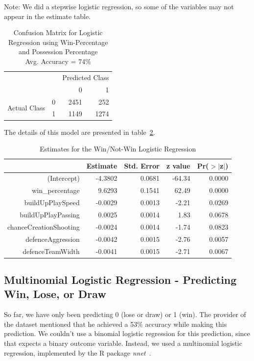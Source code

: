 \documentclass[11pt]{article}
\begin{document}
Note: We did a stepwise logistic regression, so some of the variables may not appear in the estimate table.

\begin{table}[ht!]
\centering
\begin{tabular}{|l|l|r|r|}
\hline
\multicolumn{2}{|l|}{\multirow{2}{*}{}} & \multicolumn{2}{l|}{Predicted Class} \\ \cline{3-4}
\multicolumn{2}{|l|}{}                  & 0                 & 1                \\ \hline
\multirow{2}{*}{Actual Class}    & 0    & 2451              & 252              \\ \cline{2-4}
                                 & 1    & 1149              & 1274             \\ \hline
\end{tabular}
\caption{Confusion Matrix for Logistic Regression using Win-Percentage and Possession Percentage\\Avg. Accuracy = 74\%}
\label{tab:logistic-fusion2}
\end{table}

The details of this model are presented in table~\ref{tab:logistic-estimate2}.
\begin{table}[h!]
\centering
\begin{tabular}{rrrrr}
  \hline
 & Estimate & Std. Error & z value & Pr($>$$|$z$|$) \\
  \hline
(Intercept) & -4.3802 & 0.0681 & -64.34 & 0.0000 \\
  win\_percentage & 9.6293 & 0.1541 & 62.49 & 0.0000 \\
  buildUpPlaySpeed & -0.0029 & 0.0013 & -2.21 & 0.0269 \\
  buildUpPlayPassing & 0.0025 & 0.0014 & 1.83 & 0.0678 \\
  chanceCreationShooting & -0.0024 & 0.0014 & -1.74 & 0.0823 \\
  defenceAggression & -0.0042 & 0.0015 & -2.76 & 0.0057 \\
  defenceTeamWidth & -0.0041 & 0.0015 & -2.71 & 0.0067 \\
   \hline
\end{tabular}
\caption{Estimates for the Win/Not-Win Logistic Regression}
\label{tab:logistic-estimate2}
\end{table}

\subsection{Multinomial Logistic Regression - Predicting Win, Lose, or Draw}
So far, we have only been predicting 0 (lose or draw) or 1 (win).
The provider of the dataset mentioned that he achieved a 53\% accuracy while making this prediction.
We couldn't use a binomial logistic regression for this prediction, since that expects a binary outcome variable.
Instead, we used a multinomial logistic regression, implemented by the R package \textit{nnet}~\cite{nnet}.
\end{document}

